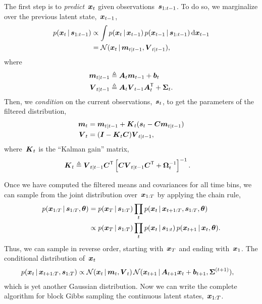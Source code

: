 
The first step is to \emph{predict}~$\boldsymbol{x}_t$ given observations~$\boldsymbol{s}_{1:t-1}$.
To do so, we marginalize over the previous latent state,~$\boldsymbol{x}_{t-1}$,
\begin{align*}
  p(\boldsymbol{x}_t \,|\, \boldsymbol{s}_{1:t-1})
  &\propto  \int p(\boldsymbol{x}_t \,|\, \boldsymbol{x}_{t-1}) \, p(\boldsymbol{x}_{t-1} \,|\, \boldsymbol{s}_{1:t-1}) \, \mathrm{d} \boldsymbol{x}_{t-1} \\
  &= \mathcal{N}(\boldsymbol{x}_t \,|\, \boldsymbol{m}_{t|t-1}, \boldsymbol{V}_{t|t-1}),
\end{align*}
where
\begin{align*}
  \boldsymbol{m}_{t|t-1} &\triangleq \boldsymbol{A}_t \boldsymbol{m}_{t-1} + \boldsymbol{b}_t \\
  \boldsymbol{V}_{t|t-1} &\triangleq \boldsymbol{A}_t \boldsymbol{V}_{t-1}\boldsymbol{A}_t^{\mathsf{T}} + \boldsymbol{\Sigma}_t.
\end{align*}
Then, we \emph{condition} on the current observations,~$\boldsymbol{s}_t$, to get the
parameters of the filtered distribution,
\begin{align}
  \nonumber
  \boldsymbol{m}_t &= \boldsymbol{m}_{t|t-1} + \boldsymbol{K}_t (\boldsymbol{s}_t - \boldsymbol{C} \boldsymbol{m}_{t|t-1}) \\
  \label{eq:kalman_filter}
  \boldsymbol{V}_t &= (\boldsymbol{I} - \boldsymbol{K}_t \boldsymbol{C}) \boldsymbol{V}_{t|t-1},
\end{align}
where~$\boldsymbol{K}_t$ is the ``Kalman gain'' matrix,
\begin{align*}
  \boldsymbol{K}_t &\triangleq \boldsymbol{V}_{t|t-1} \boldsymbol{C}^{\mathsf{T}} \left[ \boldsymbol{C} \boldsymbol{V}_{t|t-1} \boldsymbol{C}^{\mathsf{T}} + \boldsymbol{\Omega}_t^{-1} \right]^{-1}.
\end{align*}

Once we have computed the filtered means and covariances for all
time bins, we can sample from the joint distribution over~$\boldsymbol{x}_{1:T}$
by applying the chain rule,
\begin{align*}
  p(\boldsymbol{x}_{1:T} \,|\, \boldsymbol{s}_{1:T}, \boldsymbol{\theta})
  &= p(\boldsymbol{x}_T \,|\, \boldsymbol{s}_{1:T})
  \prod_{t} p(\boldsymbol{x}_{t} \,|\, \boldsymbol{x}_{t+1:T}, \boldsymbol{s}_{1:T}, \boldsymbol{\theta}) \\
  &\propto p(\boldsymbol{x}_T \,|\, \boldsymbol{s}_{1:T})
  \prod_{t} p(\boldsymbol{x}_t \,|\, \boldsymbol{s}_{1:t}) \, p(\boldsymbol{x}_{t+1} \,|\, \boldsymbol{x}_{t}, \boldsymbol{\theta}).
\end{align*}
Thus, we can sample in reverse order, starting with~$\boldsymbol{x}_T$ and ending
with~$\boldsymbol{x}_1$. The conditional distribution of~${\boldsymbol{x}_t}$
\begin{align}
  \label{eq:bkwd_sample}
  p(\boldsymbol{x}_t \,|\, \boldsymbol{x}_{t+1:T}, \boldsymbol{s}_{1:T})
  &\propto
  \mathcal{N}(\boldsymbol{x}_t \,|\, \boldsymbol{m}_t, \boldsymbol{V}_t) \,
  \mathcal{N}(\boldsymbol{x}_{t+1} \,|\, \boldsymbol{A}_{t+1}\boldsymbol{x}_{t} + \boldsymbol{b}_{t+1}, \boldsymbol{\Sigma}^{(t+1)}),
\end{align}
which is yet another Gaussian distribution. Now we can write the complete 
algorithm for block Gibbs sampling the continuous latent states,~$\boldsymbol{x}_{1:T}$.

